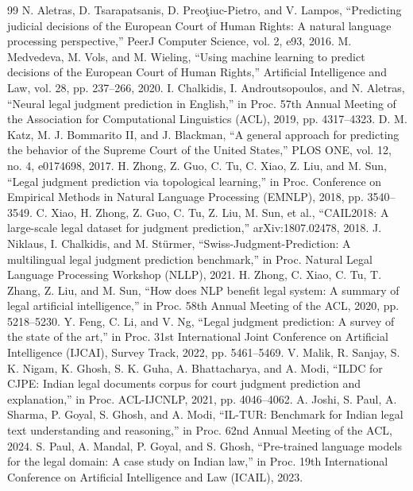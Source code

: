\begin{thebibliography}{99}
 N. Aletras, D. Tsarapatsanis, D. Preo\c{t}iuc-Pietro, and V. Lampos, ``Predicting judicial decisions of the European Court of Human Rights: A natural language processing perspective,'' PeerJ Computer Science, vol. 2, e93, 2016.
 M. Medvedeva, M. Vols, and M. Wieling, ``Using machine learning to predict decisions of the European Court of Human Rights,'' Artificial Intelligence and Law, vol. 28, pp. 237--266, 2020.
 I. Chalkidis, I. Androutsopoulos, and N. Aletras, ``Neural legal judgment prediction in English,'' in Proc. 57th Annual Meeting of the Association for Computational Linguistics (ACL), 2019, pp. 4317--4323.
 D. M. Katz, M. J. Bommarito II, and J. Blackman, ``A general approach for predicting the behavior of the Supreme Court of the United States,'' PLOS ONE, vol. 12, no. 4, e0174698, 2017.
 H. Zhong, Z. Guo, C. Tu, C. Xiao, Z. Liu, and M. Sun, ``Legal judgment prediction via topological learning,'' in Proc. Conference on Empirical Methods in Natural Language Processing (EMNLP), 2018, pp. 3540--3549.
 C. Xiao, H. Zhong, Z. Guo, C. Tu, Z. Liu, M. Sun, et al., ``CAIL2018: A large-scale legal dataset for judgment prediction,'' arXiv:1807.02478, 2018.
 J. Niklaus, I. Chalkidis, and M. St\"urmer, ``Swiss-Judgment-Prediction: A multilingual legal judgment prediction benchmark,'' in Proc. Natural Legal Language Processing Workshop (NLLP), 2021.
 H. Zhong, C. Xiao, C. Tu, T. Zhang, Z. Liu, and M. Sun, ``How does NLP benefit legal system: A summary of legal artificial intelligence,'' in Proc. 58th Annual Meeting of the ACL, 2020, pp. 5218--5230.
 Y. Feng, C. Li, and V. Ng, ``Legal judgment prediction: A survey of the state of the art,'' in Proc. 31st International Joint Conference on Artificial Intelligence (IJCAI), Survey Track, 2022, pp. 5461--5469.
 V. Malik, R. Sanjay, S. K. Nigam, K. Ghosh, S. K. Guha, A. Bhattacharya, and A. Modi, ``ILDC for CJPE: Indian legal documents corpus for court judgment prediction and explanation,'' in Proc. ACL-IJCNLP, 2021, pp. 4046--4062.
 A. Joshi, S. Paul, A. Sharma, P. Goyal, S. Ghosh, and A. Modi, ``IL-TUR: Benchmark for Indian legal text understanding and reasoning,'' in Proc. 62nd Annual Meeting of the ACL, 2024.
 S. Paul, A. Mandal, P. Goyal, and S. Ghosh, ``Pre-trained language models for the legal domain: A case study on Indian law,'' in Proc. 19th International Conference on Artificial Intelligence and Law (ICAIL), 2023.

\end{thebibliography}
